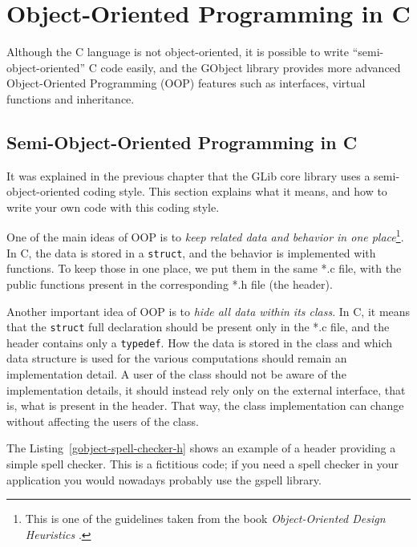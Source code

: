 \chapter{Object-Oriented Programming in C}
\label{gobject}

Although the C language is not object-oriented, it is possible to write ``semi-object-oriented'' C code easily, and the GObject library provides more advanced Object-Oriented Programming (OOP) features such as interfaces, virtual functions and inheritance.


\section{Semi-Object-Oriented Programming in C}

It was explained in the previous chapter that the GLib core library uses a semi-object-oriented coding style. This section explains what it means, and how to write your own code with this coding style.

One of the main ideas of OOP is to \emph{keep related data and behavior in one place}\footnote{This is one of the guidelines taken from the book \emph{Object-Oriented Design Heuristics} \cite{oop-book}.}. In C, the data is stored in a \lstinline{struct}, and the behavior is implemented with functions. To keep those in one place, we put them in the same *.c file, with the public functions present in the corresponding *.h file (the header).

Another important idea of OOP is to \emph{hide all data within its class}. In C, it means that the \lstinline{struct} full declaration should be present only in the *.c file, and the header contains only a \lstinline{typedef}. How the data is stored in the class and which data structure is used for the various computations should remain an implementation detail. A user of the class should not be aware of the implementation details, it should instead rely only on the external interface, that is, what is present in the header. That way, the class implementation can change without affecting the users of the class.

The Listing~\ref{gobject-spell-checker-h} shows an example of a header providing a simple spell checker. This is a fictitious code; if you need a spell checker in your application you would nowadays probably use the gspell library.



